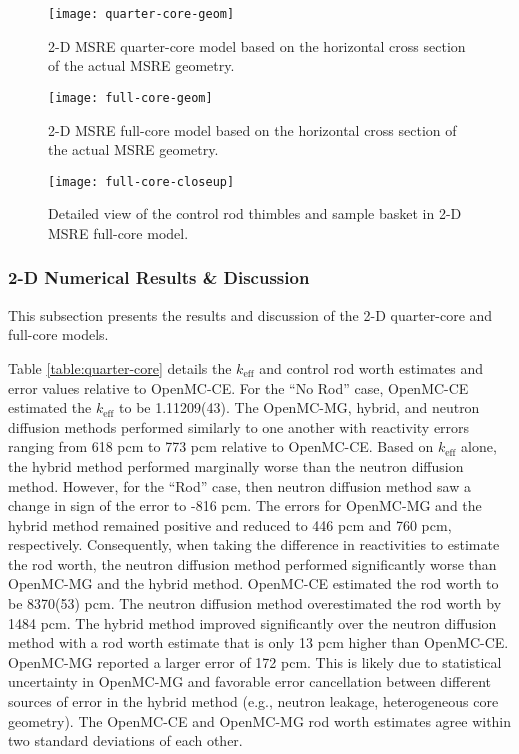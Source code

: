 \begin{figure}[p]
  \centering
  \texttt{[image: quarter-core-geom]}
  \caption{2-D \gls{MSRE} quarter-core model based on the horizontal cross section of the actual
  \gls{MSRE} geometry.}
  \label{fig:1/4-geom}
\end{figure}

\begin{figure}[p]
  \centering
  \texttt{[image: full-core-geom]}
  \caption{2-D \gls{MSRE} full-core model based on the horizontal cross section of the actual
  \gls{MSRE} geometry.}
  \label{fig:full-geom}
\end{figure}

\begin{figure}[p]
  \centering
  \texttt{[image: full-core-closeup]}
  \caption{Detailed view of the control rod thimbles and sample basket in 2-D \gls{MSRE} full-core
    model.}
  \label{fig:full-geom-closeup}
\end{figure}


\subsubsection{2-D Numerical Results \& Discussion} \label{sec:2d-nts-results}

This subsection presents the results and discussion of the 2-D quarter-core and full-core models.


Table \ref{table:quarter-core} details the $k_\text{eff}$ and control rod worth estimates and error
values relative to OpenMC-CE. For the ``No Rod'' case, OpenMC-CE estimated the $k_\text{eff}$ to be
1.11209(43). The OpenMC-MG, hybrid, and neutron diffusion methods performed
similarly to one another with reactivity errors ranging from 618 pcm to 773 pcm relative to
OpenMC-CE. Based on $k_\text{eff}$ alone, the hybrid method performed marginally worse than the
neutron diffusion method. However, for the ``Rod'' case, then neutron diffusion method saw a
change in sign of the error to -816 pcm. The errors for OpenMC-MG and the hybrid method
remained positive and reduced to 446 pcm and 760 pcm, respectively. Consequently, when taking the
difference in reactivities to estimate the rod worth, the neutron diffusion method performed
significantly worse than OpenMC-MG and the hybrid method. OpenMC-CE estimated the rod worth to be
8370(53) pcm. The neutron diffusion method overestimated the rod worth by 1484 pcm. The hybrid
method improved significantly over the neutron diffusion method with a rod worth estimate that is
only 13 pcm higher than OpenMC-CE. OpenMC-MG reported a larger error of 172 pcm. This is likely due
to statistical uncertainty in OpenMC-MG and favorable error cancellation between different sources
of error in the hybrid method (e.g., neutron leakage, heterogeneous core geometry).
The OpenMC-CE and OpenMC-MG rod worth estimates agree within two standard deviations of each other.

